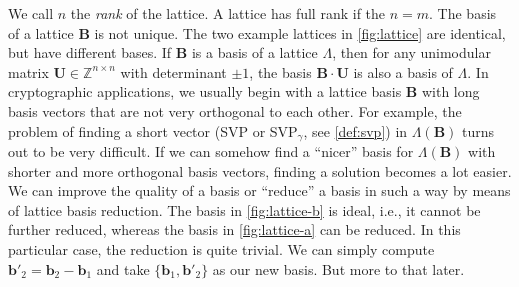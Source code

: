 We call $n$ the \textit{rank} of the lattice. A lattice has full rank if the $n=m$. The basis of a lattice $\mathbf{B}$ is not unique. The two example lattices in \cref{fig:lattice} are identical, but have different bases. If $\mathbf{B}$ is a basis of a lattice $\Lambda$, then for any unimodular matrix $\mathbf{U}\in \mathbb{Z}^{n\times n}$ with determinant $\pm 1$, the basis $\mathbf{B}\cdot \mathbf{U}$ is also a basis of $\Lambda$. In cryptographic applications, we usually begin with a lattice basis $\mathbf{B}$ with long basis vectors that are not very orthogonal to each other. For example, the problem of finding a short vector (SVP or SVP$_\gamma$, see \cref{def:svp}) in $\Lambda(\mathbf{B})$ turns out to be very difficult. If we can somehow find a ``nicer'' basis for $\Lambda(\mathbf{B})$ with shorter and more orthogonal basis vectors, finding a solution becomes a lot easier. We can improve the quality of a basis or ``reduce'' a basis in such a way by means of lattice basis reduction. The basis in \cref{fig:lattice-b} is ideal, i.e., it cannot be further reduced, whereas the basis in \cref{fig:lattice-a} can be reduced. In this particular case, the reduction is quite trivial. We can simply compute $\mathbf{b}'_2 = \mathbf{b}_2 - \mathbf{b}_1$ and take $\{\mathbf{b}_1, \mathbf{b}'_2\}$ as our new basis. But more to that later.
